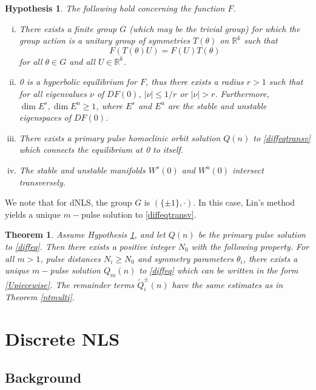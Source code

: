 \documentclass[12pt]{article}
\def\R{{\mathbb R}}
\newtheorem{theorem}{Theorem}
\newtheorem{hypothesis}{Hypothesis}
\begin{document}
\begin{hypothesis}\label{transversehyp}
The following hold concerning the function $F$.
\begin{enumerate}[(i)]
\item There exists a finite group $G$ (which may be the trivial group) for which the group action is a unitary group of symmetries $T(\theta)$ on $\R^k$ such that 
\begin{equation}\label{symmetrytransverse}
F(T(\theta)U) = F(U)T(\theta)
\end{equation}
for all $\theta \in G$ and all $U \in \R^k$. 
\item 0 is a hyperbolic equilibrium for $F$, thus there exists a radius $r > 1$ such that for all eigenvalues $\nu$ of $DF(0)$, $|\nu| \leq 1/r$ or $|\nu| > r$. Furthermore, $\dim E^s, \dim E^u \geq 1$, where $E^s$ and $E^u$ are the stable and unstable eigenspaces of $DF(0)$.
\item There exists a primary pulse homoclinic orbit solution $Q(n)$ to \eqref{diffeqtransv} which connects the equilibrium at 0 to itself.
\item The stable and unstable manifolds $W^s(0)$ and $W^u(0)$ intersect transversely.
\end{enumerate}
\end{hypothesis}
We note that for dNLS, the group $G$ is $( \{\pm 1\}, \cdot)$. In this case, Lin's method yields a unique $m-$pulse solution to \eqref{diffeqtransv}.

\begin{theorem}\label{transversemulti}
Assume Hypothesis \ref{transversehyp}, and let $Q(n)$ be the primary pulse solution to \eqref{diffeq}. Then there exists a positive integer $N_0$ with the following property. For all $m > 1$, pulse distances $N_i \geq N_0$ and symmetry parameters $\theta_i$, there exists a unique $m-$pulse solution $Q_m(n)$ to \eqref{diffeq} which can be written in the form \eqref{Upiecewise}. The remainder terms $\tilde{Q}_i^\pm(n)$ have the same estimates as in Theorem \ref{ntmulti}.
\end{theorem}

\section{Discrete NLS}\label{sec:dNLS}

\subsection{Background}
\end{document}
